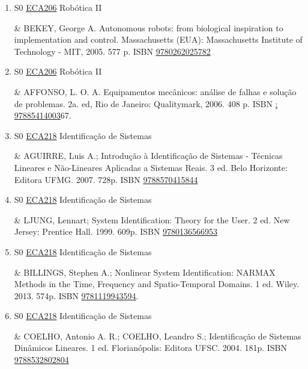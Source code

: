 \documentclass[12pt,a4paper]{book}
\begin{document}
\begin{enumerate}
&  MADRID, Marconi Kolm.  Curso sobre robôs industriais.  Fortaleza (CE): Universidade Federal do Ceará - UFC, 1992.  92 p. 
 

 \item S0 \hyperref[PUD:ECA206]{ECA206} Robótica II

&  BEKEY, George A.  Autonomous robots: from biological inspiration to implementation and control.  Massachusetts (EUA): Massachusetts Institute of Technology - MIT, 2005.  577 p.   ISBN \href{http://www.isbnsearch.org/isbn/9780262025782}{9780262025782}
 

 \item S0 \hyperref[PUD:ECA206]{ECA206} Robótica II

& AFFONSO, L.  O.  A.  Equipamentos mecânicos: análise de falhas e solução de problemas.  2a.  ed, Rio de Janeiro: Qualitymark, 2006.  408 p.  ISBN \href{http://www.google.com/search?hl=pt-BR&tbo=p&tbm=bks&q=isbn:: 97885414003&num=10}{: 97885414003}67.
 \item S0 \hyperref[PUD:ECA218]{ECA218} Identificação de Sistemas

&  AGUIRRE, Luis A.;  Introdução à Identificação de Sistemas - Técnicas Lineares e
Não-Lineares Aplicadas a Sistemas Reais.  3 ed.  Belo Horizonte: Editora UFMG.  2007. 
728p.  ISBN \href{http://www.bn.br/site/pages/servicosProfissionais/agenciaISBN/isbnBusca/FbnBuscaISBNCatalogo.asp?pField=ISBN&pIntPagina=1&pISBN=70415844&nidbISBN=true&hidbISBN=true}{9788570415844}
 

 \item S0 \hyperref[PUD:ECA218]{ECA218} Identificação de Sistemas

&  LJUNG, Lennart;  System Identification: Theory for the User.  2 ed.  New
Jersey: Prentice Hall.  1999.  609p.  ISBN \href{http://www.isbnsearch.org/isbn/9780136566953}{9780136566953}
 

 \item S0 \hyperref[PUD:ECA218]{ECA218} Identificação de Sistemas

&  BILLINGS, Stephen A.;  Nonlinear System Identification: NARMAX Methods in the Time, Frequency and Spatio-Temporal Domains.  1 ed.  Wiley.  2013.  574p.  ISBN \href{http://www.google.com/search?hl=pt-BR&tbo=p&tbm=bks&q=isbn:9781119943594&num=10}{9781119943594}.
 \item S0 \hyperref[PUD:ECA218]{ECA218} Identificação de Sistemas

&  COELHO, Antonio A.  R.;  COELHO, Leandro S.;  Identificação de Sistemas
Dinâmicos Lineares.  1 ed.  Florianópolis: Editora UFSC.  2004.  181p.  ISBN \href{http://www.bn.br/site/pages/servicosProfissionais/agenciaISBN/isbnBusca/FbnBuscaISBNCatalogo.asp?pField=ISBN&pIntPagina=1&pISBN=32802804&nidbISBN=true&hidbISBN=true}{9788532802804}
 


\end{enumerate}
\end{document}
